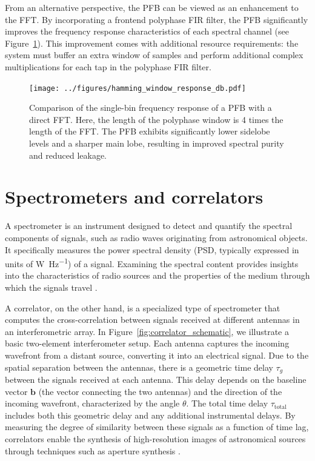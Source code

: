 From an alternative perspective, the PFB can be viewed as an enhancement to the FFT. By incorporating a frontend polyphase FIR filter, the PFB significantly improves the frequency response characteristics of each spectral channel (see Figure~\ref{fig:hamming_window_response}). This improvement comes with additional resource requirements: the system must buffer an extra window of samples and perform additional complex multiplications for each tap in the polyphase FIR filter.

\begin{figure}
	\centering
	\texttt{[image: ../figures/hamming\_window\_response\_db.pdf]}
	\caption[Comparison of single-bin frequency response between PFB and FFT]{Comparison of the single-bin frequency response of a PFB with a direct FFT. Here, the length of the polyphase window is 4 times the length of the FFT. The PFB exhibits significantly lower sidelobe levels and a sharper main lobe, resulting in improved spectral purity and reduced leakage.}
	\label{fig:hamming_window_response}
\end{figure}

\section{Spectrometers and correlators}
A spectrometer is an instrument designed to detect and quantify the spectral components of signals, such as radio waves originating from astronomical objects. It specifically measures the power spectral density (PSD, typically expressed in units of \si{\watt \per \hertz}) of a signal. Examining the spectral content provides insights into the characteristics of radio sources and the properties of the medium through which the signals travel \citep{Price2016spectrometers}.

A correlator, on the other hand, is a specialized type of spectrometer that computes the cross-correlation between signals received at different antennas in an interferometric array. In Figure~\ref{fig:correlator_schematic}, we illustrate a basic two-element interferometer setup. Each antenna captures the incoming wavefront from a distant source, converting it into an electrical signal. Due to the spatial separation between the antennas, there is a geometric time delay $\tau_g$ between the signals received at each antenna. This delay depends on the baseline vector $\mathbf{b}$ (the vector connecting the two antennas) and the direction of the incoming wavefront, characterized by the angle $\theta$. The total time delay $\tau_\text{total}$ includes both this geometric delay and any additional instrumental delays.
By measuring the degree of similarity between these signals as a function of time lag, correlators enable the synthesis of high-resolution images of astronomical sources through techniques such as aperture synthesis \citep{thompson2017interferometry}. 

